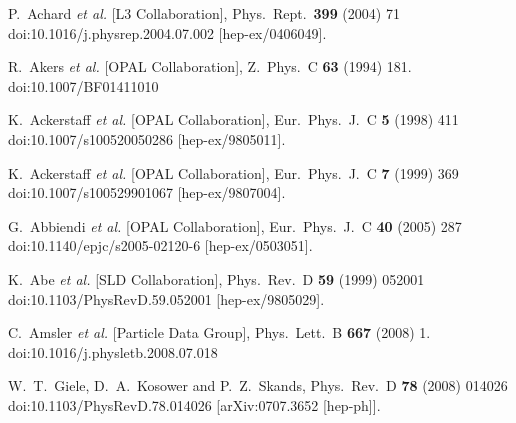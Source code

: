 \documentclass[aps,preprint,floatfix,nofootinbib,showpacs]{revtex4-1}
\begin{document}
\begin{thebibliography}{99}
  P.~Achard {\it et al.} [L3 Collaboration],
  Phys.\ Rept.\  {\bf 399} (2004) 71
  doi:10.1016/j.physrep.2004.07.002
  [hep-ex/0406049].
  
  R.~Akers {\it et al.} [OPAL Collaboration],
  Z.\ Phys.\ C {\bf 63} (1994) 181.
  doi:10.1007/BF01411010
  
  
  K.~Ackerstaff {\it et al.} [OPAL Collaboration],
  Eur.\ Phys.\ J.\ C {\bf 5} (1998) 411
  doi:10.1007/s100520050286
  [hep-ex/9805011].
  
  K.~Ackerstaff {\it et al.} [OPAL Collaboration],
  Eur.\ Phys.\ J.\ C {\bf 7} (1999) 369
  doi:10.1007/s100529901067
  [hep-ex/9807004].
  
  G.~Abbiendi {\it et al.} [OPAL Collaboration],
  Eur.\ Phys.\ J.\ C {\bf 40} (2005) 287
  doi:10.1140/epjc/s2005-02120-6
  [hep-ex/0503051].
  
  K.~Abe {\it et al.} [SLD Collaboration],
  Phys.\ Rev.\ D {\bf 59} (1999) 052001
  doi:10.1103/PhysRevD.59.052001
  [hep-ex/9805029].
  
  C.~Amsler {\it et al.} [Particle Data Group],
  Phys.\ Lett.\ B {\bf 667} (2008) 1.
  doi:10.1016/j.physletb.2008.07.018
  
  
  W.~T.~Giele, D.~A.~Kosower and P.~Z.~Skands,
  Phys.\ Rev.\ D {\bf 78} (2008) 014026
  doi:10.1103/PhysRevD.78.014026
  [arXiv:0707.3652 [hep-ph]].
  

\end{thebibliography}
\end{document}
